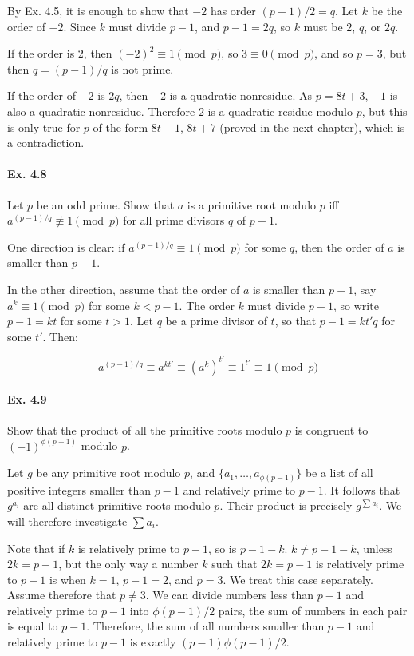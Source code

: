\documentclass[notitlepage]{article}
\theoremstyle{definition}
\begin{document}
By Ex. 4.5, it is enough to show that $-2$ has order $(p-1)/2 =
q$. Let $k$ be the order of $-2$. Since $k$ must divide $p-1$, and
$p-1 = 2q$, so $k$ must be $2$, $q$, or $2q$. 

If the order is $2$, then $(-2)^2 \equiv 1 \pmod p$, so $3 \equiv 0
\pmod p$, and so $p = 3$, but then $q = (p-1)/q$ is not prime.

If the order of $-2$ is $2q$, then $-2$ is a quadratic nonresidue. As
$p = 8t+3$, $-1$ is also a quadratic nonresidue. Therefore $2$ is a
quadratic residue modulo $p$, but this is only true for $p$ of the
form $8t+1$, $8t+7$ (proved in the next chapter), which is a
contradiction.

\paragraph{Ex. 4.8}
Let $p$ be an odd prime. Show that $a$ is a primitive root modulo $p$
iff $a^{(p-1)/q} \not \equiv 1 \pmod p$ for all prime divisors $q$ of $p - 1$.

One direction is clear: if $a^{(p-1)/q} \equiv 1 \pmod p$ for some
$q$, then the order of $a$ is smaller than $p-1$.

In the other direction, assume that the order of $a$ is smaller than
$p-1$, say $a^k \equiv 1 \pmod p$ for some $k < p-1$. The order $k$
must divide $p-1$, so write $p-1 = k t$ for some $t > 1$. Let $q$ be a
prime divisor of $t$, so that $p-1 = k t' q$ for some $t'$. Then:

\begin{equation}
  a^{(p-1)/q} \equiv a^{kt'} \equiv (a^k)^{t'} \equiv 1^{t'} \equiv 1 \pmod p
\end{equation}

\paragraph{Ex. 4.9}
Show that the product of all the primitive roots modulo $p$ is
congruent to $(-1)^{\phi(p-1)}$ modulo $p$.

Let $g$ be any primitive root modulo $p$, and $\{a_1, \ldots,
a_{\phi(p-1)}\}$ be a list of all positive integers smaller than $p-1$
and relatively prime to $p-1$. It follows that $g^{a_i}$ are all
distinct primitive roots modulo $p$. Their product is precisely
$g^{\sum a_i}$. We will therefore investigate $\sum a_i$.

Note that if $k$ is relatively prime to $p-1$, so is $p-1-k$. $k \ne
p-1-k$, unless $2k = p-1$, but the only way a number $k$ such that $2k
= p-1$ is relatively prime to $p-1$ is when $k = 1$, $p-1 = 2$, and $p
= 3$. We treat this case separately. Assume therefore that $p \ne 3$.
We can divide numbers less than $p-1$ and relatively prime to $p-1$
into $\phi(p-1)/2$ pairs, the sum of numbers in each pair is equal to
$p-1$. Therefore, the sum of all numbers smaller than $p-1$ and
relatively prime to $p-1$ is exactly $(p-1)\phi(p-1)/2$.
\end{document}
